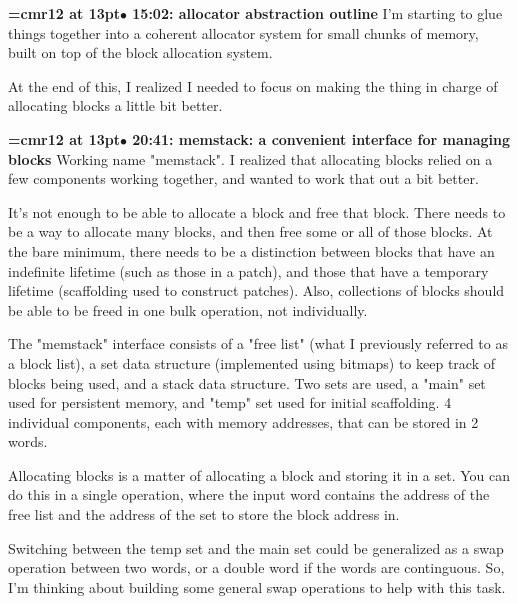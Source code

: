 {\smallskip\noindent\bf\font\titlefont=cmr12 at 13pt\titlefont $\bullet$ 15:02: allocator abstraction outline}\smallskip
I'm starting to glue things together into a coherent allocator system for small chunks of memory, built on top of the block allocation system.
\par

At the end of this, I realized I needed to focus on making the thing in charge of allocating blocks a little bit better.
\par

{\smallskip\noindent\bf\font\titlefont=cmr12 at 13pt\titlefont $\bullet$ 20:41: memstack: a convenient interface for managing blocks}\smallskip
Working name "memstack". I realized that allocating blocks relied on a few components working together, and wanted to work that out a bit better.
\par

It's not enough to be able to allocate a block and free that block. There needs to be a way to allocate many blocks, and then free some or all of those blocks. At the bare minimum, there needs to be a distinction between blocks that have an indefinite lifetime (such as those in a patch), and those that have a temporary lifetime (scaffolding used to construct patches). Also, collections of blocks should be able to be freed in one bulk operation, not individually.
\par

The "memstack" interface consists of a "free list" (what I previously referred to as a block list), a set data structure (implemented using bitmaps) to keep track of blocks being used, and a stack data structure. Two sets are used, a "main" set used for persistent memory, and "temp" set used for initial scaffolding. 4 individual components, each with memory addresses, that can be stored in 2 words.
\par

Allocating blocks is a matter of allocating a block and storing it in a set. You can do this in a single operation, where the input word contains the address of the free list and the address of the set to store the block address in.
\par

Switching between the temp set and the main set could be generalized as a swap operation between two words, or a double word if the words are continguous. So, I'm thinking about building some general swap operations to help with this task.
\par

